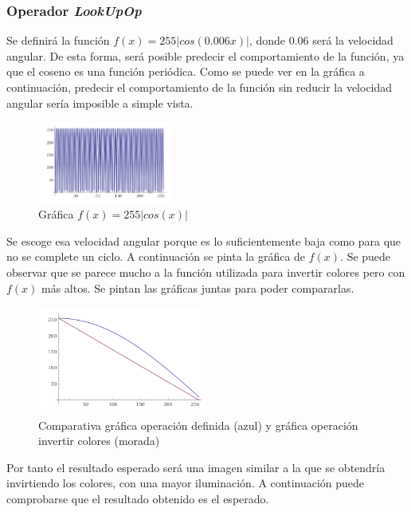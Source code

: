 \subsubsection{Operador \textit{LookUpOp}}
Se definirá la función $f(x) = 255|cos(0.006x)|$, donde $0.06$ será la velocidad angular. De esta forma, será posible predecir el comportamiento de la función, ya que el coseno es una función periódica. Como se puede ver en la gráfica a continuación, predecir el comportamiento de la función sin reducir la velocidad angular sería imposible a simple vista.
\vskip0.3cm
\begin{figure}[H]
 \centering
  \includegraphics[width=0.4\textwidth]{imagenes/graficaCoseno2.png}
 \caption{Gráfica $f(x) = 255|cos(x)|$}
 \label{diseño}
 \end{figure}
Se escoge esa velocidad angular porque es lo suficientemente baja como para que no se complete un ciclo. A continuación se pinta la gráfica de $f(x)$. Se puede observar que se parece mucho a la función utilizada para invertir colores pero con $f(x)$ más altos. Se pintan las gráficas juntas para poder compararlas.
\vskip0.3cm
\begin{figure}[H]
 \centering
  \includegraphics[width=0.5\textwidth]{imagenes/graficasjuntas.png}  
 \caption{Comparativa gráfica operación definida (azul) y gráfica operación invertir colores (morada)}
 \label{diseño}
 \end{figure}
 Por tanto el resultado esperado será una imagen similar a la que se obtendría invirtiendo los colores, con una mayor iluminación. A continuación puede comprobarse que el resultado obtenido es el esperado.
 \vskip0.3cm
